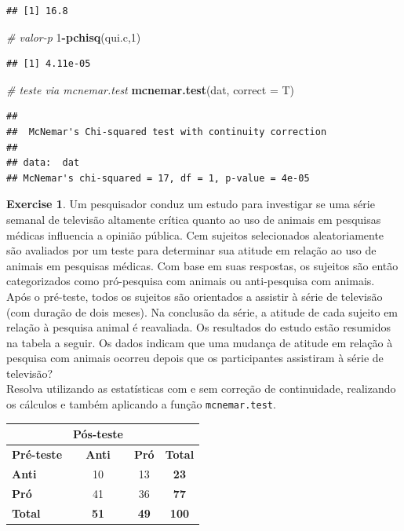 \documentclass[
]{book}
\newenvironment{Shaded}{\begin{snugshade}}{\end{snugshade}}
\newcommand{\CommentTok}[1]{\textcolor[rgb]{0.56,0.35,0.01}{\textit{#1}}}
\newcommand{\DataTypeTok}[1]{\textcolor[rgb]{0.13,0.29,0.53}{#1}}
\newcommand{\DecValTok}[1]{\textcolor[rgb]{0.00,0.00,0.81}{#1}}
\newcommand{\KeywordTok}[1]{\textcolor[rgb]{0.13,0.29,0.53}{\textbf{#1}}}
\newcommand{\NormalTok}[1]{#1}
\newcommand{\OperatorTok}[1]{\textcolor[rgb]{0.81,0.36,0.00}{\textbf{#1}}}
\theoremstyle{definition}
\theoremstyle{definition}
\theoremstyle{definition}
\newtheorem{exercise}{Exercise}[chapter]
\theoremstyle{remark}
\begin{document}
\begin{verbatim}
## [1] 16.8
\end{verbatim}

\begin{Shaded}
\begin{Highlighting}[]
\CommentTok{\# valor{-}p}
\DecValTok{1}\OperatorTok{{-}}\KeywordTok{pchisq}\NormalTok{(qui.c,}\DecValTok{1}\NormalTok{)}
\end{Highlighting}
\end{Shaded}

\begin{verbatim}
## [1] 4.11e-05
\end{verbatim}

\begin{Shaded}
\begin{Highlighting}[]
\CommentTok{\# teste via mcnemar.test}
\KeywordTok{mcnemar.test}\NormalTok{(dat, }\DataTypeTok{correct =}\NormalTok{ T)}
\end{Highlighting}
\end{Shaded}

\begin{verbatim}
## 
##  McNemar's Chi-squared test with continuity correction
## 
## data:  dat
## McNemar's chi-squared = 17, df = 1, p-value = 4e-05
\end{verbatim}

\begin{exercise}
\protect\hypertarget{exr:tv-animal}{}{\label{exr:tv-animal} }Um pesquisador conduz um estudo para investigar se uma série semanal de televisão altamente crítica quanto ao uso de animais em pesquisas médicas influencia a opinião pública. Cem sujeitos selecionados aleatoriamente são avaliados por um teste para determinar sua atitude em relação ao uso de animais em pesquisas médicas. Com base em suas respostas, os sujeitos são então categorizados como pró-pesquisa com animais ou anti-pesquisa com animais. Após o pré-teste, todos os sujeitos são orientados a assistir à série de televisão (com duração de dois meses). Na conclusão da série, a atitude de cada sujeito em relação à pesquisa animal é reavaliada. Os resultados do estudo estão resumidos na tabela a seguir. Os dados indicam que uma mudança de atitude em relação à pesquisa com animais ocorreu depois que os participantes assistiram à série de televisão?\\
Resolva utilizando as estatísticas com e sem correção de continuidade, realizando os cálculos e também aplicando a função \texttt{mcnemar.test}.

\begin{longtable}[]{@{}lccc@{}}
\toprule
& Pós-teste & &\tabularnewline
\midrule
\endhead
\textbf{Pré-teste} & \textbf{Anti} & \textbf{Pró} & \textbf{Total}\tabularnewline
\textbf{Anti} & 10 & 13 & \textbf{23}\tabularnewline
\textbf{Pró} & 41 & 36 & \textbf{77}\tabularnewline
\textbf{Total} & \textbf{51} & \textbf{49} & \textbf{100}\tabularnewline
\bottomrule
\end{longtable}
\end{exercise}
\end{document}
